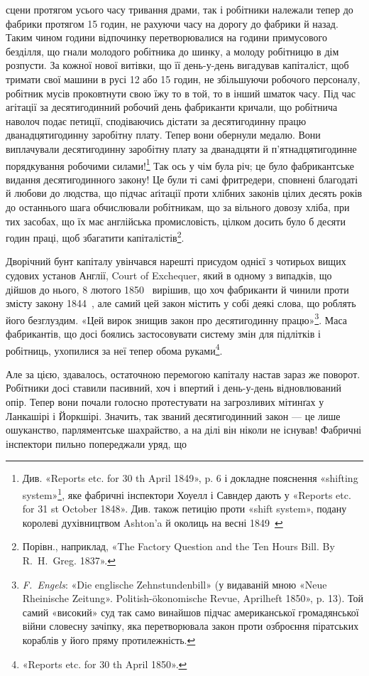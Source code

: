 \parcont{}  %
сцени протягом усього часу тривання драми, так і робітники належали
тепер до фабрики протягом 15 годин, не рахуючи часу на
дорогу до фабрики й назад. Таким чином години відпочинку перетворювалися
на години примусового безділля, що гнали молодого
робітника до шинку, а молоду робітницю в дім розпусти. За
кожної нової витівки, що її день-у-день вигадував капіталіст,
щоб тримати свої машини в русі 12 або 15 годин, не збільшуючи
робочого персоналу, робітник мусів проковтнути свою їжу то в
той, то в інший шматок часу. Під час агітації за десятигодинний
робочий день фабриканти кричали, що робітнича наволоч подає
петиції, сподіваючись дістати за десятигодинну працю дванадцятигодинну
заробітну плату. Тепер вони обернули медалю. Вони
виплачували десятигодинну заробітну плату за дванадцяти й
п’ятнадцятигодинне порядкування робочими силами!\footnote{
Див. «Reports etc. for 30 th April 1849», p. 6 і докладне пояснення
«shifting system»\footnote*{
системи пересувань. \emph{Ред.}
}, яке фабричні інспектори Хоуелл і Савндер дають
у «Reports etc. for 31 st October 1848». Див. також петицію проти
«shift system», подану королеві духівництвом Ashton’a й околиць на весні
1849~
} Так ось
у чім була річ; це було фабрикантське видання десятигодинного
закону! Це були ті самі фритредери, сповнені благодаті й любови
до людства, що підчас аґітації проти хлібних законів цілих десять
років до останнього шага обчислювали робітникам, що за вільного
довозу хліба, при тих засобах, що їх має англійська промисловість,
цілком досить було б десяти годин праці, щоб збагатити
капіталістів\footnote{
Порівн., наприклад, «The Factory Question and the Ten Hours
Bill. By R.~H.~Greg. 1837».
}.

Дворічний бунт капіталу увінчався нарешті присудом однієї
з чотирьох вищих судових установ Англії, Court of Exchequer,
який в одному з випадків, що дійшов до нього, 8 лютого 1850~
вирішив, що хоч фабриканти й чинили проти змісту закону
1844~, але самий цей закон містить у собі деякі слова, що роблять
його безглуздим. «Цей вирок знищив закон про десятигодинну
працю»\footnote{
\emph{F.~Engels}: «Die englische Zehnstundenbill» (у видаваній мною
«Neue Rheinische Zeitung». Politish-ökonomische Revue, Aprilheft
1850», p. 13). Той самий «високий» суд так само винайшов підчас американської
громадянської війни словесну зачіпку, яка перетворювала закон
проти озброєння піратських кораблів у його пряму протилежність.
}. Маса фабрикантів, що досі боялись застосовувати
систему змін для підлітків і робітниць, ухопилися за неї тепер
обома руками\footnote{
«Reports etc. for 30 th April 1850».
}.

Але за цією, здавалось, остаточною перемогою капіталу
настав зараз же поворот. Робітники досі ставили пасивний, хоч
і впертий і день-у-день відновлюваний опір. Тепер вони почали
голосно протестувати на загрозливих мітинґах у Ланкашірі і
Йоркшірі. Значить, так званий десятигодинний закон — це лише
ошуканство, парляментське шахрайство, а на ділі він ніколи не
існував! Фабричні інспектори пильно попереджали уряд, що
\parbreak{}  %
